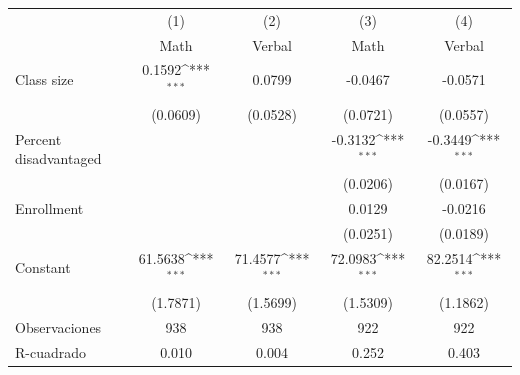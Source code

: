 {
\def\sym#1{\ifmmode^{#1}\else\(^{#1}\)\fi}
\begin{tabular}{l*{4}{c}}
\toprule
                    &\multicolumn{1}{c}{(1)}&\multicolumn{1}{c}{(2)}&\multicolumn{1}{c}{(3)}&\multicolumn{1}{c}{(4)}\\
                    &\multicolumn{1}{c}{Math}&\multicolumn{1}{c}{Verbal}&\multicolumn{1}{c}{Math}&\multicolumn{1}{c}{Verbal}\\
\midrule
Class size          &      0.1592\sym{***}&      0.0799         &     -0.0467         &     -0.0571         \\
                    &    (0.0609)         &    (0.0528)         &    (0.0721)         &    (0.0557)         \\
\addlinespace
Percent disadvantaged&                     &                     &     -0.3132\sym{***}&     -0.3449\sym{***}\\
                    &                     &                     &    (0.0206)         &    (0.0167)         \\
\addlinespace
Enrollment          &                     &                     &      0.0129         &     -0.0216         \\
                    &                     &                     &    (0.0251)         &    (0.0189)         \\
\addlinespace
Constant            &     61.5638\sym{***}&     71.4577\sym{***}&     72.0983\sym{***}&     82.2514\sym{***}\\
                    &    (1.7871)         &    (1.5699)         &    (1.5309)         &    (1.1862)         \\
\midrule
Observaciones       &         938         &         938         &         922         &         922         \\
R-cuadrado          &       0.010         &       0.004         &       0.252         &       0.403         \\
\bottomrule
\end{tabular}
}
